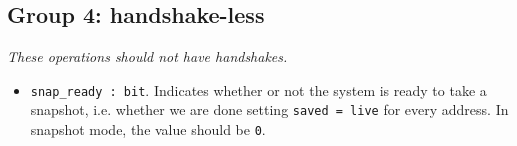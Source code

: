 \documentclass[a4paper]{article}
\newcommand{\code}[1]{\texttt{#1}}
\begin{document}
\subsection*{Group 4: handshake-less}
\emph{These operations should not have handshakes.}
\begin{itemize}
\item \code{snap\_ready : bit}. Indicates whether or not the system is ready to take a snapshot, i.e. whether we are done setting \code{saved = live} for every address. In snapshot mode, the value should be \code{0}.
\end{itemize}
\end{document}
